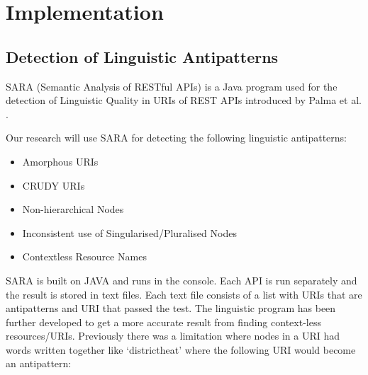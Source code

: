 \section{Implementation}

\subsection{Detection of Linguistic Antipatterns}

SARA (Semantic Analysis of RESTful APIs) is a Java program used for the detection of Linguistic Quality in URIs of REST APIs introduced by Palma et al. \cite{linguistic}. 

Our research will use SARA \cite{linguistic} for detecting the following linguistic antipatterns:
\begin{itemize}
\item Amorphous URIs
\item CRUDY URIs
\item Non-hierarchical Nodes
\item Inconsistent use of Singularised/Pluralised Nodes
\item Contextless Resource Names
\end{itemize}


SARA is built on JAVA and runs in the console. Each API is run separately and the result is stored in text files. Each text file consists of a list with URIs that are antipatterns and URI that passed the test.
The linguistic program has been further developed to get a more accurate result from finding context-less resources/URIs. Previously there was a limitation where nodes in a URI had words written together like `districtheat' where the following URI would become an antipattern: 

